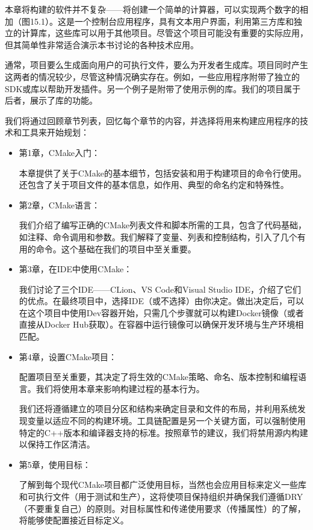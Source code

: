 本章将构建的软件并不复杂——将创建一个简单的计算器，可以实现两个数字的相加（图15.1）。这是一个控制台应用程序，具有文本用户界面，利用第三方库和独立的计算库，这些库可以用于其他项目。尽管这个项目可能没有重要的实际应用，但其简单性非常适合演示本书讨论的各种技术应用。


通常，项目要么生成面向用户的可执行文件，要么为开发者生成库。项目同时产生这两者的情况较少，尽管这种情况确实存在。例如，一些应用程序附带了独立的SDK或库以帮助开发插件。另一个例子是附带了使用示例的库。我们的项目属于后者，展示了库的功能。

我们将通过回顾章节列表，回忆每个章节的内容，并选择将用来构建应用程序的技术和工具来开始规划：

\begin{itemize}
\item
第1章，CMake入门：

本章提供了关于CMake的基本细节，包括安装和用于构建项目的命令行使用。还包含了关于项目文件的基本信息，如作用、典型的命名约定和特殊性。

\item
第2章，CMake语言：

我们介绍了编写正确的CMake列表文件和脚本所需的工具，包含了代码基础，如注释、命令调用和参数。我们解释了变量、列表和控制结构，引入了几个有用的命令。这个基础在我们的项目中至关重要。

\item
第3章，在IDE中使用CMake：

我们讨论了三个IDE——CLion、VS Code和Visual Studio IDE，介绍了它们的优点。在最终项目中，选择IDE（或不选择）由你决定。做出决定后，可以在这个项目中使用Dev容器开始，只需几个步骤就可以构建Docker镜像（或者直接从Docker Hub获取）。在容器中运行镜像可以确保开发环境与生产环境相匹配。

\item
第4章，设置CMake项目：

配置项目至关重要，其决定了将生效的CMake策略、命名、版本控制和编程语言。我们将使用本章来影响构建过程的基本行为。

我们还将遵循建立的项目分区和结构来确定目录和文件的布局，并利用系统发现变量以适应不同的构建环境。工具链配置是另一个关键方面，可以强制使用特定的C++版本和编译器支持的标准。按照章节的建议，我们将禁用源内构建以保持工作区清洁。

\item
第5章，使用目标：

了解到每个现代CMake项目都广泛使用目标，当然也会应用目标来定义一些库和可执行文件（用于测试和生产），这将使项目保持组织并确保我们遵循DRY（不要重复自己）的原则。对目标属性和传递使用要求（传播属性）的了解，将能够使配置接近目标定义。


\end{itemize}
